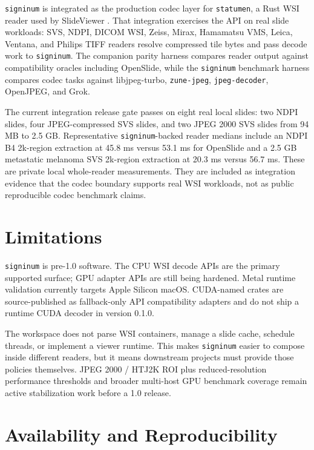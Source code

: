 \documentclass[11pt]{article}
\newcommand{\signinum}{\texttt{signinum}}
\newcommand{\crate}[1]{\texttt{#1}}
\begin{document}
\signinum{} is integrated as the production codec layer for \crate{statumen}, a
Rust WSI reader used by SlideViewer \citep{wsirs}. That integration exercises
the API on real slide workloads: SVS, NDPI, DICOM WSI, Zeiss, Mirax,
Hamamatsu VMS, Leica, Ventana, and Philips TIFF readers resolve compressed
tile bytes and pass decode work to \signinum{}. The companion parity harness
compares reader output against compatibility oracles including OpenSlide,
while the \signinum{} benchmark harness compares codec tasks against
libjpeg-turbo, \crate{zune-jpeg}, \crate{jpeg-decoder}, OpenJPEG, and Grok.

The current integration release gate passes on eight real local slides: two
NDPI slides, four JPEG-compressed SVS slides, and two JPEG 2000 SVS slides
from 94 MB to 2.5 GB. Representative \signinum-backed reader medians include an
NDPI B4 2k-region extraction at 45.8 ms versus 53.1 ms for OpenSlide and a
2.5 GB metastatic melanoma SVS 2k-region extraction at 20.3 ms versus 56.7 ms.
These are private local whole-reader measurements. They are included as
integration evidence that the codec boundary supports real WSI workloads, not
as public reproducible codec benchmark claims.

\section{Limitations}

\signinum{} is pre-1.0 software. The CPU WSI decode APIs are the primary
supported surface; GPU adapter APIs are still being hardened. Metal runtime
validation currently targets Apple Silicon macOS. CUDA-named crates are
source-published as fallback-only API compatibility adapters and do not ship a
runtime CUDA decoder in version 0.1.0.

The workspace does not parse WSI containers, manage a slide cache, schedule
threads, or implement a viewer runtime. This makes \signinum{} easier to compose
inside different readers, but it means downstream projects must provide those
policies themselves. JPEG 2000 / HTJ2K ROI plus reduced-resolution performance
thresholds and broader multi-host GPU benchmark coverage remain active
stabilization work before a 1.0 release.

\section{Availability and Reproducibility}
\end{document}
